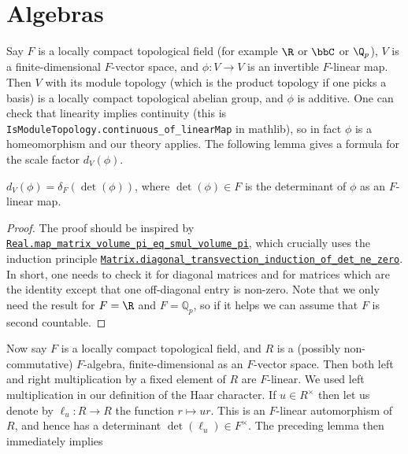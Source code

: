 \section{Algebras}

  Say $F$ is a locally compact topological field (for example $\R$ or $\bbC$ or $\Q_p$), $V$
  is a finite-dimensional $F$-vector space, and $\phi:V\to V$ is an invertible $F$-linear map.
  Then $V$ with its module topology (which is the product topology if one picks a basis)
  is a locally compact topological abelian group, and $\phi$ is additive.
  One can check that linearity implies continuity (this is {\tt IsModuleTopology.continuous\_of\_linearMap} in mathlib),
  so in fact $\phi$ is a homeomorphism
  and our theory applies. The following lemma gives a formula for the scale factor $d_V(\phi)$.

\begin{lemma}
  \label{addHaarScalarFactor_eq_distribHaarChar_det}
  $d_V(\phi)=\delta_F(\det(\phi))$, where $\det(\phi)\in F$ is the determinant of $\phi$ as an $F$-linear map.
\end{lemma}
\begin{proof}
The proof should be inspired by \href{https://leanprover-community.github.io/mathlib4\_docs/Mathlib/MeasureTheory/Measure/Lebesgue/Basic.html\#Real.map\_matrix\_volume\_pi\_eq\_smul\_volume\_pi}{\tt Real.map\_matrix\_volume\_pi\_eq\_smul\_volume\_pi},
which crucially uses the induction principle \href{https://leanprover-community.github.io/mathlib4\_docs/Mathlib/LinearAlgebra/Matrix/Transvection.html\#Matrix.diagonal\_transvection\_induction\_of\_det\_ne\_zero}{\tt Matrix.diagonal\_transvection\_induction\_of\_det\_ne\_zero}.
In short, one needs to check it for diagonal matrices and for matrices which are the identity
except that one off-diagonal entry is non-zero. Note that we only need the result for $F=\R$
and $F=\mathbb{Q}_p$, so if it helps we can assume that $F$ is second countable.
\end{proof}

  Now say $F$ is a locally compact topological field, and $R$ is a (possibly non-commutative)
  $F$-algebra, finite-dimensional as an $F$-vector space. Then both left and right multiplication
  by a fixed element of $R$ are $F$-linear. We used left multiplication in our definition
  of the Haar character. If $u\in R^\times$ then let us denote by $\ell_u:R\to R$
  the function $r\mapsto ur$. This is an $F$-linear automorphism of $R$, and hence has a
  determinant $\det(\ell_u)\in F^\times$.
  The preceding lemma then immediately implies

